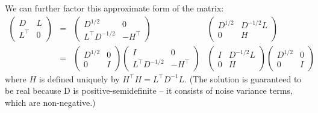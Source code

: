 We can further factor this approximate form of the matrix:
\[
\begin{array}{cccc}
\begin{pmatrix}
D & L\\
L^\top & 0
\end{pmatrix}
&=&
\begin{pmatrix}
D^{1/2} & 0\\
L^\top D^{-1/2} & -H^\top
\end{pmatrix}
&
\begin{pmatrix}
D^{1/2} & D^{-1/2}L\\
0 & H
\end{pmatrix}\\[1em]
&=&

\begin{pmatrix}
D^{1/2} & 0\\
0 & I
\end{pmatrix}
\begin{pmatrix}
I & 0\\
L^\top D^{-1/2} & -H^\top
\end{pmatrix}
&
\begin{pmatrix}
I & D^{-1/2}L\\
0 & H
\end{pmatrix}
\begin{pmatrix}
D^{1/2} & 0\\
0 & I
\end{pmatrix}

\end{array}
\]
where $H$ is defined uniquely by $H^\top H = L^\top D^{-1} L$.  (The solution is guaranteed to be real because D is positive-semidefinite -- it consists of noise variance terms, which are non-negative.)

